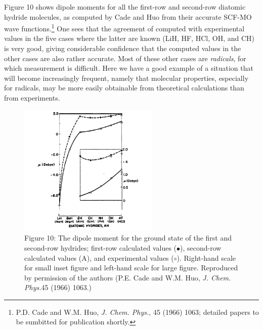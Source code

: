 \documentclass[11pt]{memoir}
\begin{document}
Figure 10 shows dipole moments for all the first-row and second-row diatomic hydride molecules, as computed by Cade and Huo from their accurate SCF-MO wave functions.\footnote{P.D. Cade and W.M. Huo, \emph{J. Chem. Phys.}, 45 (1966) 1063; detailed papers to be sumbitted for publication shortly.}  One sees that the agreement of computed with experimental values in the five cases where the latter are known (LiH, HF, HCl, OH, and CH) is very good, giving considerable confidence that the computed values in the other cases are also rather accurate.  Most of these other cases are \emph{radicals}, for which measurement is difficult.  Here we have a good example of a situation that will become increasingly frequent, namely that molecular properties, especially for radicals, may be more easily obtainable from theoretical calculations than from experiments.


\begin{figure}
\begin{center}
\includegraphics[width=0.6\textwidth]{images/mulliken_figure10.png}
\end{center}
\caption*{Figure 10: The dipole moment for the ground state of the first and second-row hydrides; first-row calculated values ($\bullet$), second-row calculated values (A), and experimental values ($\circ$).  Right-hand scale for small inset figure and left-hand scale for large figure.  Reproduced by permission of the authors (P.E. Cade and W.M. Huo, \emph{J. Chem. Phys.}45 (1966) 1063.)}
\end{figure}
\end{document}
